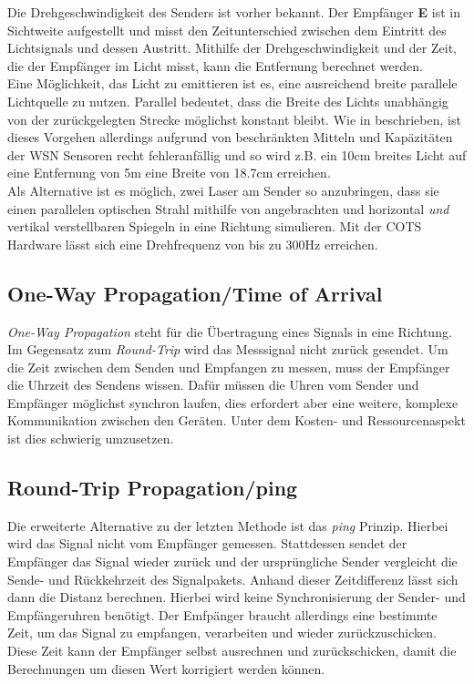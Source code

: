 \documentclass[12pt, a4wide]{scrreprt}
\begin{document}
Die Drehgeschwindigkeit des Senders ist vorher bekannt. Der Empfänger {\bf E} ist in Sichtweite aufgestellt und misst den Zeitunterschied zwischen dem Eintritt des Lichtsignals und dessen Austritt. Mithilfe der Drehgeschwindigkeit und der Zeit, die der Empfänger im Licht misst, kann die Entfernung berechnet werden.\\
\indent
Eine Möglichkeit, das Licht zu emittieren ist es, eine ausreichend breite parallele Lichtquelle zu nutzen. Parallel bedeutet, dass die Breite des Lichts unabhängig von der zurückgelegten Strecke möglichst konstant bleibt. Wie in \cite{lighthouse} beschrieben, ist dieses Vorgehen allerdings aufgrund von beschränkten Mitteln und Kapäzitäten der WSN Sensoren recht fehleranfällig und so wird z.B. ein 10cm breites Licht auf eine Entfernung von 5m eine Breite von 18.7cm erreichen.\\
\indent
Als Alternative ist es möglich, zwei Laser am Sender so anzubringen, dass sie einen parallelen optischen Strahl mithilfe von angebrachten und horizontal \textit{und} vertikal verstellbaren Spiegeln in eine Richtung simulieren. Mit der COTS Hardware lässt sich eine Drehfrequenz von bis zu 300Hz\cite{lighthouse} erreichen. 
\newpage
    \subsection{One-Way Propagation/Time of Arrival}
\textit{One-Way Propagation} steht für die Übertragung eines Signals in eine Richtung. Im Gegensatz zum \textit{Round-Trip} wird das Messsignal nicht zurück gesendet. Um die Zeit zwischen dem Senden und Empfangen zu messen, muss der Empfänger die Uhrzeit des Sendens wissen. Dafür müssen die Uhren vom Sender und Empfänger möglichst synchron laufen, dies erfordert aber eine weitere, komplexe Kommunikation zwischen den Geräten. Unter dem Kosten- und Ressourcenaspekt ist dies schwierig umzusetzen.
	\subsection{Round-Trip Propagation/ping}
Die erweiterte Alternative zu der letzten Methode ist das \textit{ping} Prinzip. Hierbei wird das Signal nicht vom Empfänger gemessen. Stattdessen sendet der Empfänger das Signal wieder zurück und der ursprüngliche Sender vergleicht die Sende- und Rückkehrzeit des Signalpakets. Anhand dieser Zeitdifferenz lässt sich dann die Distanz berechnen. Hierbei wird keine Synchronisierung der Sender- und Empfängeruhren benötigt. Der Emfpänger braucht allerdings eine bestimmte Zeit, um das Signal zu empfangen, verarbeiten und wieder zurückzuschicken. Diese Zeit kann der Empfänger selbst ausrechnen und zurückschicken, damit die Berechnungen um diesen Wert korrigiert werden können.\\
\end{document}
